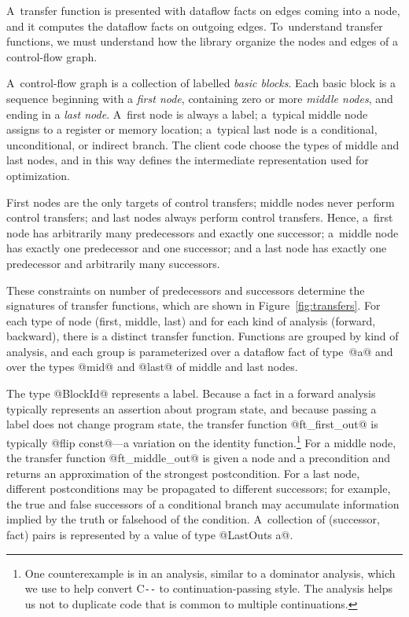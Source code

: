 \documentclass[blockstyle,preprint,natbib,nocopyrightspace]{sigplanconf}
\newcommand\PAL{\mbox{C{\texttt{-{}-}}}}
\newcommand\figref[1]{Figure~\ref{fig:#1}}
\begin{document}
A~transfer function is presented with dataflow facts on edges coming
into a node, and it computes the dataflow facts on outgoing edges.
To~understand transfer functions, we must 
understand how the library organize the nodes and edges of a control-flow graph.

A~control-flow graph is a collection of labelled \emph{basic blocks}.
Each basic block is a sequence beginning with a \emph{first node},
containing zero or more \emph{middle nodes},
and ending in a \emph{last node}.
A~first node is always a label;
a~typical middle node assigns to a register or memory
location;
a~typical last node is a conditional, unconditional, or indirect branch.
The client code choose the types of middle and last nodes, and in this
way defines the intermediate
representation used for optimization.




First nodes are the only targets of control transfers;
middle nodes never perform control transfers;
and
last nodes always perform control transfers.
Hence, a~first node has arbitrarily many predecessors and exactly one
successor;
a~middle node has exactly one predecessor and one successor;
and a last node has exactly one predecessor and arbitrarily many
successors. 

These constraints on number of predecessors and successors determine
the signatures of 
transfer functions, 
which are shown in \figref{transfers}.
For each type of node (first, middle, last) and for each kind of
analysis (forward, backward), there is a distinct transfer function.
Functions are grouped by kind of analysis, and each group is
parameterized over a dataflow fact of type~@a@ and over the types
@mid@ and @last@ of middle and last nodes.  


The type @BlockId@ represents a label.
Because a fact in a forward analysis typically represents an assertion
about program state,
 and because passing a label does not change
program state, the transfer function @ft_first_out@ is typically 
@flip const@---a variation on
the
identity function.\footnote
{One counterexample is in an
analysis, similar to a dominator analysis,
which we use to help convert {\PAL} to continuation-passing style.
The  analysis
helps us not to duplicate code that is common to multiple continuations.
}
For a middle node, the transfer function @ft_middle_out@ is given a
node and a precondition and returns an approximation of the strongest
postcondition. 
For a last node, different postconditions may be propagated to
different successors; for example, the true and false successors of a
conditional branch may accumulate information implied by the truth or
falsehood of the condition.
A~collection of (successor, fact) pairs is represented by a value of
type @LastOuts a@.
\end{document}
